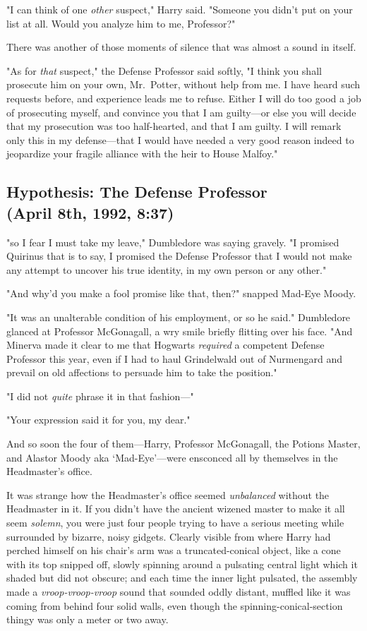 "I can think of one \emph{other} suspect," Harry said. "Someone you didn't put
on your list at all. Would you analyze him to me, Professor?"

There was another of those moments of silence that was almost a sound in itself.

"As for \emph{that} suspect," the Defense Professor said softly, "I think you
shall prosecute him on your own, Mr.~Potter, without help from me. I have heard
such requests before, and experience leads me to refuse. Either I will do too
good a job of prosecuting myself, and convince you that I am guilty—or else
you will decide that my prosecution was too half-hearted, and that I am guilty.
I will remark only this in my defense—that I would have needed a very good
reason indeed to jeopardize your fragile alliance with the heir to House
Malfoy."
\sbreak
\vspace{-2\baselineskip}
\subsection{Hypothesis: The Defense Professor\\
(April 8th, 1992, 8:37\PM)}

"{\el}so I fear I must take my leave," Dumbledore was saying gravely. "I
promised Quirinus{\el} that is to say, I promised the Defense
Professor{\el} that I would not make any attempt to uncover his true
identity, in my own person or any other."

"And why'd you make a fool promise like that, then?" snapped Mad-Eye Moody.

"It was an unalterable condition of his employment, or so he said." Dumbledore
glanced at Professor McGonagall, a wry smile briefly flitting over his face.
"And Minerva made it clear to me that Hogwarts \emph{required} a competent
Defense Professor this year, even if I had to haul Grindelwald out of
Nurmengard and prevail on old affections to persuade him to take the position."

"I did not \emph{quite} phrase it in that fashion—"

"Your expression said it for you, my dear."

And so soon the four of them—Harry, Professor McGonagall, the Potions Master,
and Alastor Moody aka `Mad-Eye'—were ensconced all by themselves in the
Headmaster's office.

It was strange how the Headmaster's office seemed{\el}
\emph{unbalanced{\el}} without the Headmaster in it. If you didn't have the
ancient wizened master to make it all seem \emph{solemn}, you were just four
people trying to have a serious meeting while surrounded by bizarre, noisy
gidgets. Clearly visible from where Harry had perched himself on his chair's
arm was a truncated-conical object, like a cone with its top snipped off,
slowly spinning around a pulsating central light which it shaded but did not
obscure; and each time the inner light pulsated, the assembly made a
\emph{vroop-vroop-vroop} sound that sounded oddly distant, muffled like it was
coming from behind four solid walls, even though the spinning-conical-section
thingy was only a meter or two away.

